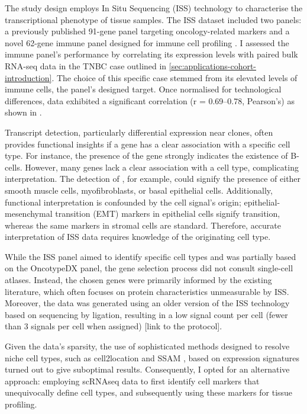 The study design employs In Situ Sequencing (\ac{ISS}) technology to characterise the transcriptional phenotype of tissue samples. The \ac{ISS} dataset included two panels: a previously published 91-gene panel targeting oncology-related markers and a novel 62-gene immune panel designed for immune cell profiling . I assessed the immune panel's performance by correlating its expression levels with paired bulk RNA-seq data in the \acf{TNBC} case outlined in \cref{sec:applications-cohort-introduction}. The choice of this specific case stemmed from its elevated levels of immune cells, the panel's designed target. Once normalised for technological differences, data exhibited a significant correlation (r = 0.69–0.78, Pearson's) as shown in .

Transcript detection, particularly differential expression near clones, often provides functional insights if a gene has a clear association with a specific cell type. For instance, the presence of the  gene strongly indicates the existence of B-cells. However, many genes lack a clear association with a cell type, complicating interpretation. The detection of , for example, could signify the presence of either smooth muscle cells, myofibroblasts, or basal epithelial cells. Additionally, functional interpretation is confounded by the cell signal's origin; epithelial-mesenchymal transition (EMT) markers in epithelial cells signify transition, whereas the same markers in stromal cells are standard. Therefore, accurate interpretation of \ac{ISS} data requires knowledge of the originating cell type.

While the \ac{ISS} panel aimed to identify specific cell types and was partially based on the OncotypeDX panel, the gene selection process did not consult single-cell atlases. Instead, the chosen genes were primarily informed by the existing literature, which often focuses on protein characteristics unmeasurable by \ac{ISS}. Moreover, the data was generated using an older version of the \ac{ISS} technology based on sequencing by ligation, resulting in a low signal count per cell (fewer than 3 signals per cell when assigned) [link to the protocol].

Given the data's sparsity, the use of sophisticated methods designed to resolve niche cell types, such as cell2location \parencite{Kleshchevnikov2022-ub} and SSAM \parencite{Park2021-hi}, based on expression signatures turned out to give suboptimal results. Consequently, I opted for an alternative approach: employing \ac{scRNAseq} data to first identify cell markers that unequivocally define cell types, and subsequently using these markers for tissue profiling.

